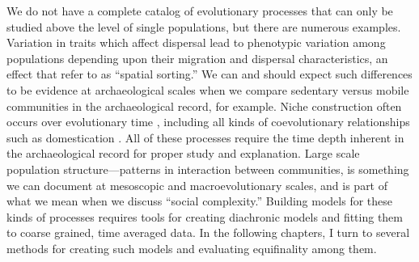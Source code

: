 We do not have a complete catalog of evolutionary processes that can only be studied above the level of single populations, but there are numerous examples. Variation in traits which affect dispersal lead to phenotypic variation among populations depending upon their migration and dispersal characteristics, an effect that \citet{shine2011evolutionary} refer to as ``spatial sorting.''  We can and should expect such differences to be evidence at archaeological scales when we compare sedentary versus mobile communities in the archaeological record, for example.  Niche construction often occurs over evolutionary time \citep{Laland2000,Odling-Smee2003,Odling-Smee2007}, including all kinds of coevolutionary relationships such as domestication \citep{rindos1984origins}.  All of these processes require the time depth inherent in the archaeological record for proper study and explanation.  Large scale population structure---patterns in interaction between communities, is something we can document at mesoscopic and macroevolutionary scales, and is part of what we mean when we discuss ``social complexity.''  Building models for these kinds of processes requires tools for creating diachronic models and fitting them to coarse grained, time averaged data.  In the following chapters, I turn to several methods for creating such models and evaluating equifinality among them.  


